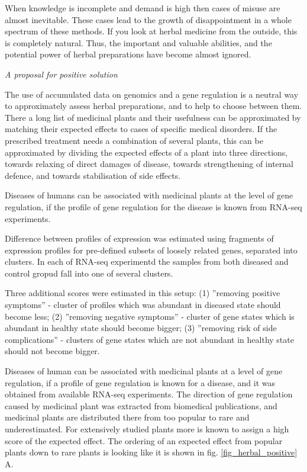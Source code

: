 \documentclass[12pt,aps]{revtex4}
\begin{document}
When knowledge is incomplete and demand is high then cases of misuse
are almost inevitable. These cases lead to the growth of
disappointment in a whole spectrum of these methods. If you look at
herbal medicine from the outside, this is completely natural. Thus,
the important and valuable abilities, and the potential power of
herbal preparations have become almost ignored.

\emph{A proposal for positive solution}

The use of accumulated data on genomics and a gene regulation is a
neutral way to approximately assess herbal preparations, and to help
to choose between them.
There a long list of medicinal plants and their usefulness can be
approximated by matching their expected effects to cases of specific
medical disorders. If the prescribed treatment needs a combination of
several plants, this can be approximated by dividing the expected
effects of a plant into three directions, towards relaxing of
direct damages of disease, towards strengthening of internal defence, and
towards stabilisation of side effects.

Diseases of humans can be associated with medicinal plants at the
level of gene regulation, if the profile of gene regulation for the
disease is known from RNA-seq experiments.

Difference between profiles of expression was estimated using
fragments of expression profiles for pre-defined subsets of loosely
related genes, separated into clusters. In each of RNA-seq experimentd
the samples from both diseased and control gropud fall into one of
several clusters.

Three additional scores were estimated in this setup: (1) ''removing
positive symptoms'' - cluster of profiles which was abundant in
diseased state should become less; (2) ''removing negative symptoms''
- cluster of gene states which is abundant in healthy state should
become bigger; (3) ''removing risk of side complications'' - clusters
of gene states which are not abundant in healthy state should not
become bigger.        


Diseases of human can be associated with medicinal plants at a level of gene regulation, if a profile of gene regulation is known for a disease, and it was obtained from available RNA-seq experiments. The direction of gene regulation caused by medicinal plant was
extracted from biomedical publications, and medicinal plants are distributed there from too popular to rare and underestimated. For extensively studied plants more is known to assign a high score of the expected effect. The ordering of an expected effect from popular plants down to rare plants is looking like it is shown in fig.  \ref{fig_herbal_positive} A.  
\end{document}
